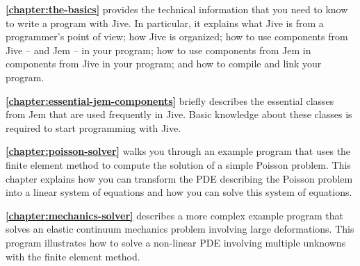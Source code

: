 \textbf{\autoref{chapter:the-basics}} provides the technical
information that you need to know to write a program with Jive. In
particular, it explains what Jive is from a programmer's point of view;
how Jive is organized; how to use components from Jive -- and Jem --
in your program; how to use components from Jem in components from Jive
in your program; and how to compile and link your program.

\textbf{\autoref{chapter:essential-jem-components}} briefly describes the
essential classes from Jem that are used frequently in Jive. Basic
knowledge about these classes is required to start programming with Jive.

\textbf{\autoref{chapter:poisson-solver}} walks you through an
example program that uses the finite element method to compute the
solution of a simple Poisson problem. This chapter explains how you can
transform the PDE describing the Poisson problem into a linear system
of equations and how you can solve this system of equations.

\textbf{\autoref{chapter:mechanics-solver}} describes a more complex
example program that solves an elastic continuum mechanics problem
involving large deformations. This program illustrates how to solve a
non-linear PDE involving multiple unknowns with the finite element
method.

